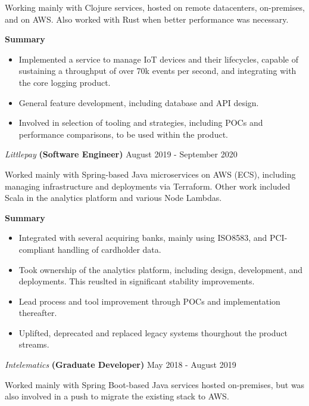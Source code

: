 \documentclass[margin, 11pt]{style}
\begin{document}
\begin{resume}
Working mainly with Clojure services, hosted on remote datacenters, on-premises, and on AWS. Also worked with Rust when better performance was necessary.

\textbf{Summary}

\begin{itemize}
\item Implemented a service to manage IoT devices and their lifecycles, capable of sustaining a throughput of over 70k events per second, and integrating with the core logging product.
\item General feature development, including database and API design.
\item Involved in selection of tooling and strategies, including POCs and performance comparisons, to be used within the product.
\end{itemize}

\pagebreak

{\sl Littlepay} \textbf{(Software Engineer)} \hfill August 2019 - September 2020

Worked mainly with Spring-based Java microservices on AWS (ECS), including managing infrastructure and deployments via Terraform. Other work included Scala in the analytics platform and various Node Lambdas.

\textbf{Summary}

\begin{itemize}
\item Integrated with several acquiring banks, mainly using ISO8583, and PCI-compliant handling of cardholder data.
\item Took ownership of the analytics platform, including design, development, and deployments. This reuslted in significant stability improvements.
\item Lead process and tool improvement through POCs and implementation thereafter.
\item Uplifted, deprecated and replaced legacy systems thourghout the product streams.
\end{itemize}

\vspace{15pt}
{\sl Intelematics} \textbf{(Graduate Developer)} \hfill May 2018 - August 2019

Worked mainly with Spring Boot-based Java services hosted on-premises, but was also involved in a push to migrate the existing stack to AWS.


\end{resume}
\end{document}

